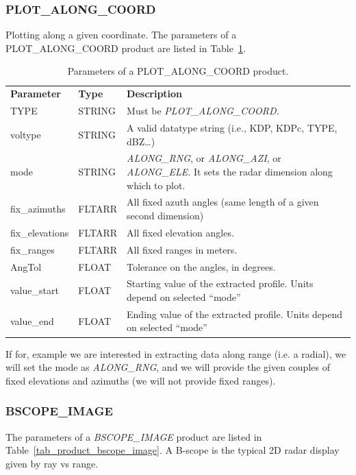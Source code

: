 \documentclass[a4paper,11pt,pdftex,twoside]{scrartcl}
\renewcommand{\bf}{\normalfont \bfseries}
\begin{document}
{{{\subsubsection{PLOT\_ALONG\_COORD}
  \label{subsec_plot_along_coord}
Plotting along a given coordinate. The parameters of a PLOT\_ALONG\_COORD product are listed in Table~\ref{tab_product_plot_along_coord}.

\begin{table}[H]
 \begin{tabularx}{\textwidth}{llX}
 \bf{Parameter}  & \bf{Type}  & \bf{Description}\\
 TYPE           & STRING     & Must be \emph{PLOT\_ALONG\_COORD}.\\
 voltype        & STRING     & A valid datatype string (i.e., KDP, KDPc, TYPE, dBZ\dots)\\
 mode           & STRING     & \emph{ALONG\_RNG}, or \emph{ALONG\_AZI}, or \emph{ALONG\_ELE}. It sets the radar dimension along which to plot. \\
 fix\_azimuths & FLTARR & All fixed azuth angles (same length of a given second dimension) \\
 fix\_elevations & FLTARR & All fixed elevation angles. \\ 
 fix\_ranges & FLTARR &  All fixed ranges in meters. \\
 AngTol & FLOAT & Tolerance on the angles, in degrees. \\
 value\_start & FLOAT & Starting value of the extracted profile. Units depend on selected ``mode'' \\
 value\_end   & FLOAT & Ending value of the extracted profile. Units depend on selected ``mode''\\
 \end{tabularx}
 \caption{Parameters of a PLOT\_ALONG\_COORD product.}
 \label{tab_product_plot_along_coord}
 \end{table}

If for, example we are interested in extracting data along range (i.e. a radial), we will set the mode as \emph{ALONG\_RNG}, and we will provide the given couples of fixed elevations and azimuths (we will not provide fixed ranges). 

 \subsubsection{BSCOPE\_IMAGE}
 \label{subsec_bscope_image}

The parameters of a \emph{BSCOPE\_IMAGE} product are listed in Table~\ref{tab_product_bscope_image}.
A B-scope is the typical 2D radar display given by ray vs range.

}}}
\end{document}
